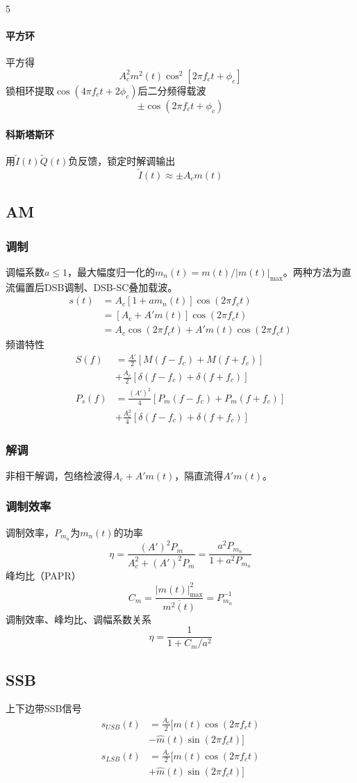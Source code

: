 \documentclass[8pt, a4paper]{extarticle}
\begin{document}
\begin{multicols}{5}
\paragraph{平方环}
平方得
\[
A_c^2m^2(t)\cos^2[2\pi f_c t +\phi_c]
\]
锁相环提取\(\cos(4\pi f_c t +2\phi_c)\)后二分频得载波
\[
\pm\cos(2\pi f_c t +\phi_c)
\]
\paragraph{科斯塔斯环}
用\(\tilde{I}(t)\tilde{Q}(t)\)负反馈，锁定时解调输出
\[
\tilde{I}(t)\approx \pm A_c m(t)
\]
\subsection{AM}
\subsubsection{调制}
调幅系数\(a\leq 1\)，最大幅度归一化的\(m_n(t)=m(t)/|m(t)|_{\max}\)。两种方法为直流偏置后DSB调制、DSB-SC叠加载波。
\begin{align*}
s(t) &=A_c[1+am_n(t)]\cos(2\pi f_c t)\\
&=[A_c+A'm(t)]\cos(2\pi f_c t)\\
&=A_c\cos(2\pi f_c t)+A'm(t)\cos(2\pi f_c t)
\end{align*}
频谱特性
\begin{align*}
S(f)&=\frac{A'}{2}[M(f-f_c)+M(f+f_c)]\\
&+\frac{A_c}{2}[\delta(f-f_c)+\delta(f+f_c)]\\
P_s(f)&=\frac{{(A')}^2}{4}[P_m(f-f_c)+P_m(f+f_c)]\\
&+\frac{A_c^2}{4}[\delta(f-f_c)+\delta(f+f_c)]
\end{align*}
\subsubsection{解调}
非相干解调，包络检波得\(A_c+A'm(t)\)，隔直流得\(A'm(t)\)。
\subsubsection{调制效率}
调制效率，\(P_{m_n}\)为\(m_n(t)\)的功率
\[
\eta = \frac{{(A')^2}P_m}{A_c^2+{(A')}^2P_m} =\frac{a^2P_{m_n}}{1+a^2P_{m_n}}
\]
峰均比（PAPR）
\[
C_m=\frac{|m(t)|^2_{\max}}{\overline{m^2(t)}}=P_{m_n}^{-1}
\]
调制效率、峰均比、调幅系数关系
\[
\eta = \frac{1}{1+C_m/a^2}
\]
\subsection{SSB}
上下边带SSB信号
\begin{align*}
s_{USB}(t)&=\frac{A_c}{2}[m(t)\cos(2\pi f_c t)\\
&-\hat{m}(t)\sin(2\pi f_c t)]\\
s_{LSB}(t)&=\frac{A_c}{2}[m(t)\cos(2\pi f_c t)\\
&+\hat{m}(t)\sin(2\pi f_c t)]
\end{align*}

\end{multicols}
\end{document}
